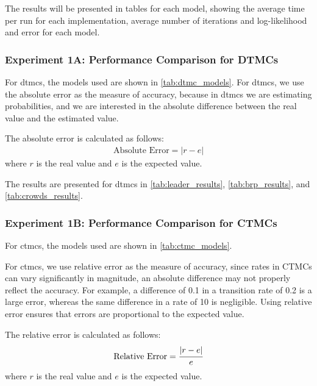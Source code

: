 The results will be presented in tables for each model, showing the average time per run for each implementation, average number of iterations and log-likelihood and error for each model.

\subsubsection{Experiment 1A: Performance Comparison for DTMCs}
For \glspl{dtmc}, the models used are shown in \autoref{tab:dtmc_models}.
For \glspl{dtmc}, we use the absolute error as the measure of accuracy, because in \glspl{dtmc} we are estimating probabilities, and we are interested in the absolute difference between the real value and the estimated value.

The absolute error is calculated as follows:
\begin{equation}
    \begin{aligned}
        \text{Absolute Error} = |r - e|
    \end{aligned}
\end{equation}
where $r$ is the real value and $e$ is the expected value.

The results are presented for \glspl{dtmc} in \autoref{tab:leader_results}, \autoref{tab:brp_results}, and \autoref{tab:crowds_results}.

\subsubsection{Experiment 1B: Performance Comparison for CTMCs}
For \glspl{ctmc}, the models used are shown in \autoref{tab:ctmc_models}.

For \glspl{ctmc}, we use relative error as the measure of accuracy, since rates in CTMCs can vary significantly in magnitude, an absolute difference may not properly reflect the accuracy.
For example, a difference of 0.1 in a transition rate of 0.2 is a large error, whereas the same difference in a rate of 10 is negligible.
Using relative error ensures that errors are proportional to the expected value.

The relative error is calculated as follows:
\begin{equation}
    \begin{aligned}
        \text{Relative Error} = \cfrac{|r - e|}{e}
    \end{aligned}
\end{equation}
where $r$ is the real value and $e$ is the expected value.

